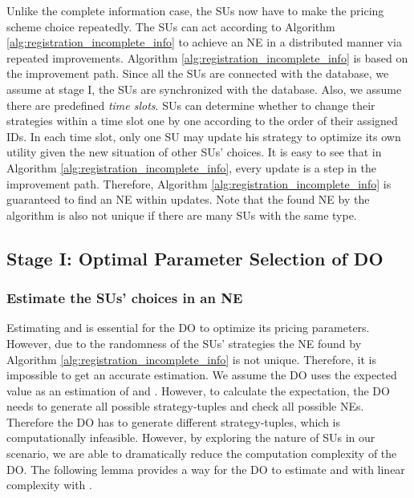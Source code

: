 \documentclass[journal]{IEEEtran}
\begin{document}
Unlike the complete information case, the SUs now have to make the pricing scheme choice repeatedly. The SUs can act according to Algorithm \ref{alg:registration_incomplete_info} to achieve an NE in a distributed manner via repeated improvements. Algorithm \ref{alg:registration_incomplete_info} is based on the improvement path. Since all the SUs are connected with the database, we assume at stage I, the SUs are synchronized with the database. Also, we assume there are predefined \emph{time slots}. SUs can determine whether to change their strategies within a time slot one by one according to the order of their assigned IDs. In each time slot, only one SU may update his strategy to optimize its own utility given the new situation of other SUs' choices. It is easy to see that in Algorithm \ref{alg:registration_incomplete_info}, every update is a step in the improvement path. Therefore, Algorithm \ref{alg:registration_incomplete_info} is guaranteed to find an NE within  updates. Note that the found NE by the algorithm is also not unique if there are many SUs with the same type.

\subsection{Stage I: Optimal Parameter Selection of DO}

\subsubsection{Estimate the SUs' choices in an NE}

Estimating  and  is essential for the DO to optimize its pricing parameters. However, due to the randomness of the SUs' strategies the NE found by Algorithm \ref{alg:registration_incomplete_info} is not unique. Therefore, it is impossible to get an accurate estimation. We assume the DO uses the expected value as an estimation of  and . However, to calculate the expectation, the DO needs to generate all possible strategy-tuples and check all possible NEs. Therefore the DO has to generate  different strategy-tuples, which is computationally infeasible. However, by exploring the nature of SUs in our scenario, we are able to dramatically reduce the computation complexity of the DO. The following lemma provides a way for the DO to estimate  and  with linear complexity with .
\end{document}
